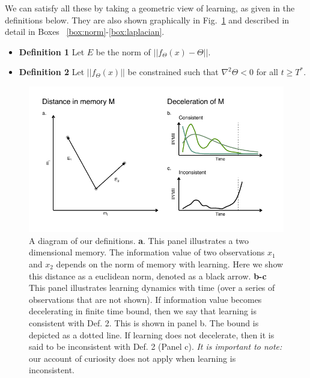 We can satisfy all these by taking a geometric view of learning, as given in the definitions below. They are also shown graphically in Fig.~\ref{fig:cartoon} and described in detail in Boxes ~\ref{box:norm}-\ref{box:laplacian}.

\begin{itemize}
	\item[] \textbf{Definition 1} Let $E$ be the norm of $|| f_{\Theta}(x) - \Theta ||$.	
	\item[] \textbf{Definition 2} Let $|| f_{\Theta}(x)||$ be constrained such that $\nabla^2 \Theta < 0$ for all $ t \ge T^*$. 	
\end{itemize}

\begin{figure}
	\begin{fullwidth}
	\includegraphics[width=0.7\linewidth]{img/cartoon.pdf} 
	\caption{A diagram of our definitions. 
	\textbf{a}. This panel illustrates a two dimensional memory. The information value of two observations $x_1$ and $x_2$ depends on the norm of memory with learning. Here we show this distance as a euclidean norm, denoted as a black arrow.
	\textbf{b-c} This panel illustrates learning dynamics with time (over a series of observations that are not shown). If information value becomes decelerating in finite time bound, then we say that learning is consistent with Def. 2. This is shown in panel b. The bound is depicted as a dotted line. If learning does not decelerate, then it is said to be inconsistent with Def. 2 (Panel c). \textit{It is important to note:} our account of curiosity does not apply when learning is inconsistent.
  	}
	\label{fig:cartoon} 
	\end{fullwidth}
\end{figure}

